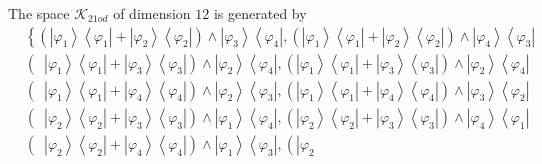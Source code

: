 \documentclass[aps,preprint]{revtex4}%
\begin{document}
The space $\mathcal{K}_{21od}$ of dimension $12$ is generated by
\begin{align}
&  \left\{  \left(  \left\vert \varphi_{1}\right\rangle \left\langle
\varphi_{1}\right\vert +\left\vert \varphi_{2}\right\rangle \left\langle
\varphi_{2}\right\vert \right)  \wedge\left\vert \varphi_{3}\right\rangle
\left\langle \varphi_{4}\right\vert ,\left(  \left\vert \varphi_{1}%
\right\rangle \left\langle \varphi_{1}\right\vert +\left\vert \varphi
_{2}\right\rangle \left\langle \varphi_{2}\right\vert \right)  \wedge
\left\vert \varphi_{4}\right\rangle \left\langle \varphi_{3}\right\vert
\right.  \nonumber\\
&  \left(  \,\,\,\left\vert \varphi_{1}\right\rangle \left\langle \varphi
_{1}\right\vert +\left\vert \varphi_{3}\right\rangle \left\langle \varphi
_{3}\right\vert \right)  \wedge\left\vert \varphi_{2}\right\rangle
\left\langle \varphi_{4}\right\vert ,\left(  \left\vert \varphi_{1}%
\right\rangle \left\langle \varphi_{1}\right\vert +\left\vert \varphi
_{3}\right\rangle \left\langle \varphi_{3}\right\vert \right)  \wedge
\left\vert \varphi_{2}\right\rangle \left\langle \varphi_{4}\right\vert
\nonumber\\
&  \left(  \,\,\,\left\vert \varphi_{1}\right\rangle \left\langle \varphi
_{1}\right\vert +\left\vert \varphi_{4}\right\rangle \left\langle \varphi
_{4}\right\vert \right)  \wedge\left\vert \varphi_{2}\right\rangle
\left\langle \varphi_{3}\right\vert ,\left(  \left\vert \varphi_{1}%
\right\rangle \left\langle \varphi_{1}\right\vert +\left\vert \varphi
_{4}\right\rangle \left\langle \varphi_{4}\right\vert \right)  \wedge
\left\vert \varphi_{3}\right\rangle \left\langle \varphi_{2}\right\vert
\nonumber\\
&  \left(  \,\,\,\left\vert \varphi_{2}\right\rangle \left\langle \varphi
_{2}\right\vert +\left\vert \varphi_{3}\right\rangle \left\langle \varphi
_{3}\right\vert \right)  \wedge\left\vert \varphi_{1}\right\rangle
\left\langle \varphi_{4}\right\vert ,\left(  \left\vert \varphi_{2}%
\right\rangle \left\langle \varphi_{2}\right\vert +\left\vert \varphi
_{3}\right\rangle \left\langle \varphi_{3}\right\vert \right)  \wedge
\left\vert \varphi_{4}\right\rangle \left\langle \varphi_{1}\right\vert
\nonumber\\
&  \left(  \,\,\,\left\vert \varphi_{2}\right\rangle \left\langle \varphi
_{2}\right\vert +\left\vert \varphi_{4}\right\rangle \left\langle \varphi
_{4}\right\vert \right)  \wedge\left\vert \varphi_{1}\right\rangle
\left\langle \varphi_{3}\right\vert ,\left(  \left\vert \varphi_{2}%

\end{align}
\end{document}
